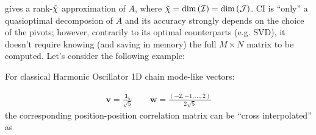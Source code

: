 
 gives a rank-${\tilde \chi}$ approximation of $A$, where ${\tilde \chi} = \text{dim}\left( \mathcal{I} \right) = \text{dim}\left( \mathcal{J} \right)$. CI is ``only'' a quasioptimal decomposion of $A$ and its accuracy strongly depends on the choice of the pivots; however, contrarily to its optimal counterparts (e.g. SVD), it doesn't require knowing (and saving in memory) the full $M \times N$ matrix to be computed. Let's consider the following example: 
\begin{example}
\label{ex:CIcorrmat}
For classical Harmonic Oscillator 1D chain mode-like vectors: 

\[
\begin{alignedat}{2}      
	\boldsymbol{v} = \frac{\boldsymbol{1}_5}{\sqrt{5}} \qquad \boldsymbol{w} = \frac{(-2,-1,\dots,2)}{2\sqrt{5}}
\end{alignedat}
\]
the corresponding position-position correlation matrix can be ``cross interpolated'' as 


\end{example}
